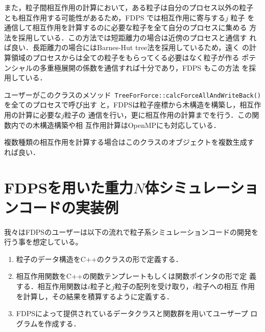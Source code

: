 \documentclass[submit,techreq,noauthor]{ipsj}
\begin{document}
また，粒子間相互作用の計算において，ある粒子は自分のプロセス以外の粒子
とも相互作用する可能性があるため，FDPS では相互作用に寄与する$j$ 粒子
を通信して相互作用を計算するのに必要な粒子を全て自分のプロセスに集める
方法を採用している．この方法では短距離力の場合は近傍のプロセスと通信す
れば良い．長距離力の場合にはBarnes-Hut tree法を採用しているため，遠く
の計算領域のプロセスからは全ての粒子をもらってくる必要はなく粒子が作る
ポテンシャルの多重極展開の係数を通信すれば十分であり，FDPS もこの方法
を採用している\cite{2004PASJ...56..521M}．


ユーザーがこのクラスのメソッド{\tt
  TreeForForce::calcForceAllAndWriteBack()}を全てのプロセスで呼び出す
と，FDPSは粒子座標から木構造を構築し，相互作用の計算に必要な$j$粒子の
通信を行い，更に相互作用の計算までを行う．この関数内での木構造構築や相
互作用計算はOpenMPにも対応している．

複数種類の相互作用を計算する場合はこのクラスのオブジェクトを複数生成す
れば良い．




\section{FDPSを用いた重力$N$体シミュレーションコードの実装例}

我々はFDPSのユーザーは以下の流れで粒子系シミュレーションコードの開発を
行う事を想定している。

\begin{enumerate}
\item 粒子のデータ構造をC++のクラスの形で定義する．
\item 相互作用関数をC++の関数テンプレートもしくは関数ポインタの形で定
  義する．相互作用関数は$i$粒子と$j$粒子の配列を受け取り，$i$粒子への相互
  作用を計算し，その結果を積算するように定義する．
\item FDPSによって提供されているデータクラスと関数群を用いてユーザープ
  ログラムを作成する．
\end{enumerate}
\end{document}
